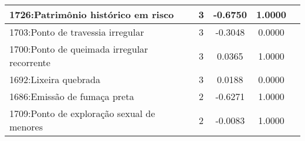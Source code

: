 \begin{table}[htbp]
\begin{tabular}{|l|c|c|c|c|}
		\hline
		1726:Patrimônio histórico em risco          & 3                & -0.6750        & 1.0000           \\
		\hline
		1703:Ponto de travessia irregular           & 3                & -0.3048        & 0.0000           \\
		\hline
		1700:Ponto de queimada irregular recorrente & 3                & 0.0365         & 1.0000           \\
		\hline
		1692:Lixeira quebrada                       & 3                & 0.0188         & 0.0000           \\
		\hline
		1686:Emissão de fumaça preta                & 2                & -0.6271        & 1.0000           \\
		\hline
		1709:Ponto de exploração sexual de menores  & 2                & -0.0083        & 1.0000           \\
		\hline
	\end{tabular}
\end{table}

